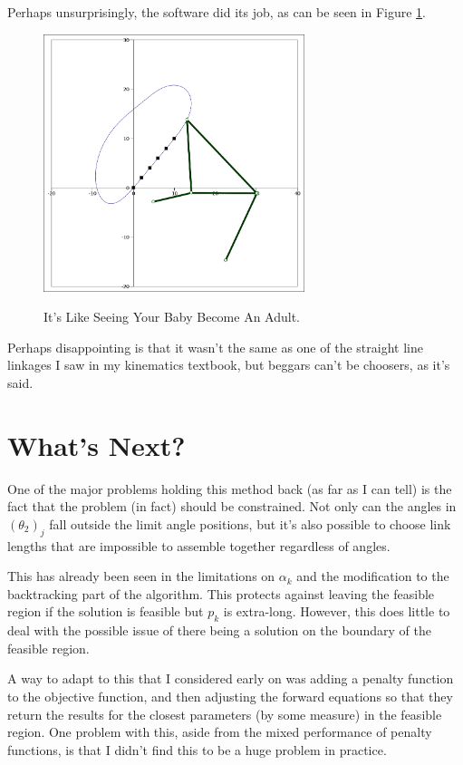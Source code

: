 \documentclass[12pt, letterpaper]{article}
\begin{document}
Perhaps unsurprisingly, the software did its job, as can be seen in Figure \ref{fig:apply_solution}. 

\begin{figure}[H]
\centering
\caption{It's Like Seeing Your Baby Become An Adult.}
\includegraphics[width=3.0in]{apply_solution}
\label{fig:apply_solution}
\end{figure}

Perhaps disappointing is that it wasn't the same as one of the straight line linkages I saw in my kinematics textbook, but beggars can't be choosers, as it's said. 

\section*{What's Next?}

One of the major problems holding this method back (as far as I can tell) is the fact that the problem (in fact) should be constrained. Not only can the angles in \((\theta_2)_j\) fall outside the limit angle positions, but it's also possible to choose link lengths that are impossible to assemble together regardless of angles.

This has already been seen in the limitations on \(\alpha_k\) and the modification to the backtracking part of the algorithm. This protects against leaving the feasible region if the solution is feasible but \(p_k\) is extra-long. However, this does little to deal with the possible issue of there being a solution on the boundary of the feasible region.

A way to adapt to this that I considered early on was adding a penalty function to the objective function, and then adjusting the forward equations so that they return the results for the closest parameters (by some measure) in the feasible region. One problem with this, aside from the mixed performance of penalty functions, is that I didn't find this to be a huge problem in practice.
\end{document}
